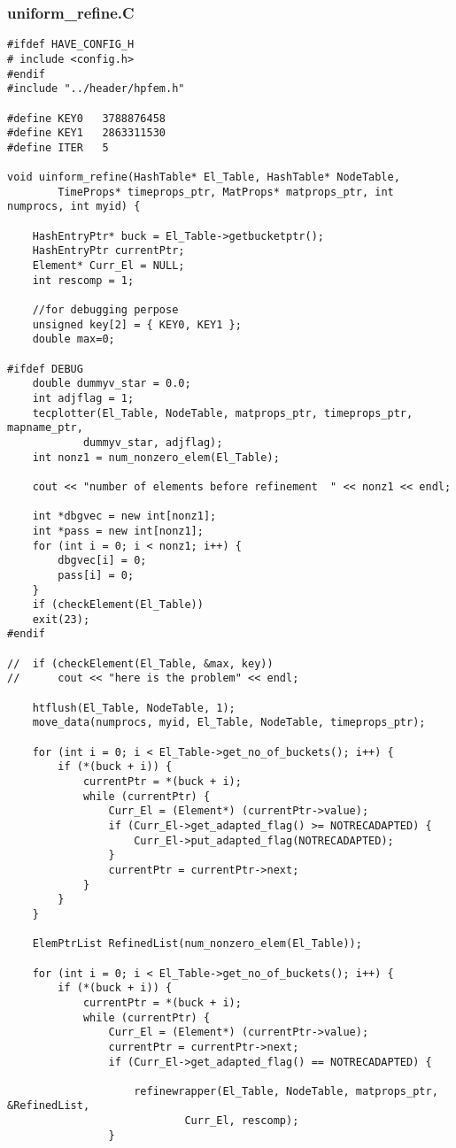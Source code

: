 \documentclass[a4paper,10pt]{article}
\begin{document}
\subsubsection{uniform\_refine.C}
\begin{lstlisting}
#ifdef HAVE_CONFIG_H
# include <config.h>
#endif
#include "../header/hpfem.h"

#define KEY0   3788876458
#define KEY1   2863311530
#define ITER   5

void uinform_refine(HashTable* El_Table, HashTable* NodeTable,
		TimeProps* timeprops_ptr, MatProps* matprops_ptr, int numprocs, int myid) {

	HashEntryPtr* buck = El_Table->getbucketptr();
	HashEntryPtr currentPtr;
	Element* Curr_El = NULL;
	int rescomp = 1;

	//for debugging perpose
	unsigned key[2] = { KEY0, KEY1 };
	double max=0;

#ifdef DEBUG
	double dummyv_star = 0.0;
	int adjflag = 1;
	tecplotter(El_Table, NodeTable, matprops_ptr, timeprops_ptr, mapname_ptr,
			dummyv_star, adjflag);
	int nonz1 = num_nonzero_elem(El_Table);

	cout << "number of elements before refinement  " << nonz1 << endl;

	int *dbgvec = new int[nonz1];
	int *pass = new int[nonz1];
	for (int i = 0; i < nonz1; i++) {
		dbgvec[i] = 0;
		pass[i] = 0;
	}
	if (checkElement(El_Table))
	exit(23);
#endif

//	if (checkElement(El_Table, &max, key))
//		cout << "here is the problem" << endl;

	htflush(El_Table, NodeTable, 1);
	move_data(numprocs, myid, El_Table, NodeTable, timeprops_ptr);

	for (int i = 0; i < El_Table->get_no_of_buckets(); i++) {
		if (*(buck + i)) {
			currentPtr = *(buck + i);
			while (currentPtr) {
				Curr_El = (Element*) (currentPtr->value);
				if (Curr_El->get_adapted_flag() >= NOTRECADAPTED) {
					Curr_El->put_adapted_flag(NOTRECADAPTED);
				}
				currentPtr = currentPtr->next;
			}
		}
	}

	ElemPtrList RefinedList(num_nonzero_elem(El_Table));

	for (int i = 0; i < El_Table->get_no_of_buckets(); i++) {
		if (*(buck + i)) {
			currentPtr = *(buck + i);
			while (currentPtr) {
				Curr_El = (Element*) (currentPtr->value);
				currentPtr = currentPtr->next;
				if (Curr_El->get_adapted_flag() == NOTRECADAPTED) {

					refinewrapper(El_Table, NodeTable, matprops_ptr, &RefinedList,
							Curr_El, rescomp);
				}


\end{lstlisting}
\end{document}
